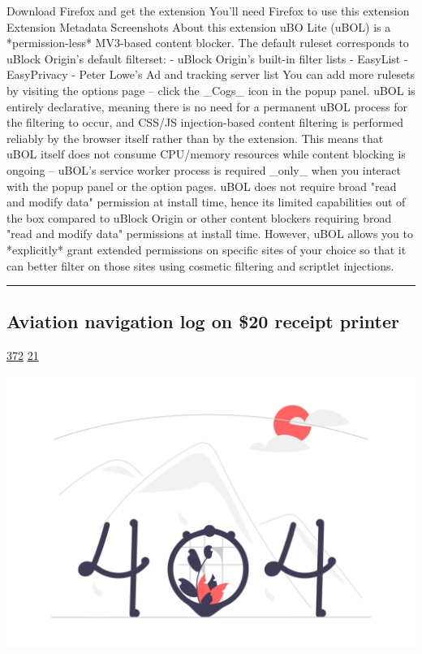 \documentclass[10pt,a4paper]{article}
\begin{document}
\begin{multicols*}{2}
Download Firefox and get the extension
You'll need Firefox to use this extension
Extension Metadata
Screenshots
About this extension
uBO Lite (uBOL) is a *permission-less* MV3-based content blocker.
The default ruleset corresponds to uBlock Origin's default filterset:
- uBlock Origin's built-in filter lists
- EasyList
- EasyPrivacy
- Peter Lowe’s Ad and tracking server list
You can add more rulesets by visiting the options page -- click the \_Cogs\_ icon in the popup panel.
uBOL is entirely declarative, meaning there is no need for a permanent uBOL process for the filtering to occur, and CSS/JS injection-based content filtering is performed reliably by the browser itself rather than by the extension. This means that uBOL itself does not consume CPU/memory resources while content blocking is ongoing -- uBOL's service worker process is required \_only\_ when you interact with the popup panel or the option pages.
uBOL does not require broad "read and modify data" permission at install time, hence its limited capabilities out of the box compared to uBlock Origin or other content blockers requiring broad "read and modify data" permissions at install time.
However, uBOL allows you to *explicitly* grant extended permissions on specific sites of your choice so that it can better filter on those sites using cosmetic filtering and scriptlet injections.
\par\noindent\textcolor{red}{\rule{\linewidth}{0.2mm}}
\vfill
\null
\noindent\begin{minipage}{\linewidth}
\subsection{Aviation navigation log on \$20 receipt printer}
\textsc{\footnotesize
{\scriptsize\faThumbsOUp}\space 
\href{http://news.ycombinator.com/item?id=37190743\&utm\_term=comment}{372} 
{\scriptsize\faComments}\space 
\href{http://news.ycombinator.com/item?id=37190743\&utm\_term=comment}{21} 
}
\par\medskip\noindent
\href{https://carloslagoa.com/blog/flipreps/flipreps.html?utm\_source=hackernewsletter\&utm\_medium=email\&utm\_term=show\_hn}{
    \includegraphics[width=0.99\linewidth]{notfound.png}
}
\end{minipage}

\end{multicols*}
\end{document}
